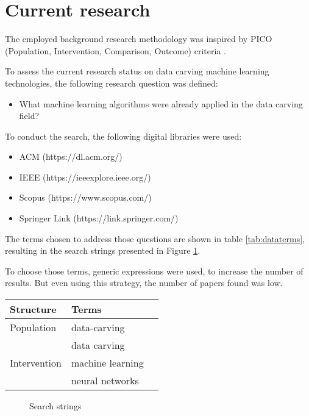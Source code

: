 \section{Current research}
The employed background research methodology was inspired by PICO (Population, Intervention, Comparison, Outcome) criteria \cite{Kitchenham07guidelinesfor}.

To assess the current research status on data carving machine learning technologies, the following research question was defined:

\begin{itemize}
    \item What machine learning algorithms were already applied in the data carving field?
\end{itemize}

To conduct the search, the following digital libraries were used: 
\begin{itemize}
\item{ACM} (https://dl.acm.org/)
\item IEEE (https://ieeexplore.ieee.org/)
\item Scopus (https://www.scopus.com/) 
\item Springer Link (https://link.springer.com/)
\end{itemize}

The terms chosen to address those questions are shown in table \ref{tab:dataterms}, resulting in the search strings presented in  Figure \ref{fig:datasearchstring}.

To choose those terms, generic expressions were used, to increase the number of results. But even using this strategy, the number of papers found was low.


\begin{table*}[!ht]
    \centering
    \begin{tabular}{ l  l  l }
      Structure 	& Terms 		\\
      \hline\hline
      Population 	& data-carving \\   
                    & data carving \\
      \hline
      Intervention 	& machine learning \\
                    & neural networks \\
      \hline
    \end{tabular}
    \caption{Terms used}
    \label{tab:dataterms}
\end{table*}

\begin{figure}[!ht]
  \centering
  \caption{Search strings}
  \label{fig:datasearchstring}
\end{figure}


